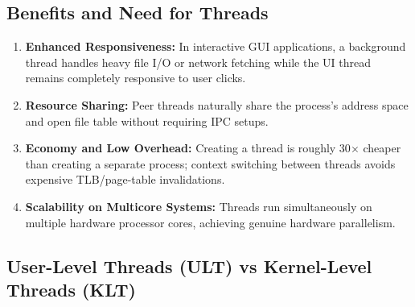 \documentclass[11pt,a4paper]{article}
\begin{document}
\begin{center}
\end{center}

\subsection{Benefits and Need for Threads}

\begin{enumerate}
    \item \textbf{Enhanced Responsiveness:} In interactive GUI applications, a background thread handles heavy file I/O or network fetching while the UI thread remains completely responsive to user clicks.
    \item \textbf{Resource Sharing:} Peer threads naturally share the process's address space and open file table without requiring IPC setups.
    \item \textbf{Economy and Low Overhead:} Creating a thread is roughly 30$\times$ cheaper than creating a separate process; context switching between threads avoids expensive TLB/page-table invalidations.
    \item \textbf{Scalability on Multicore Systems:} Threads run simultaneously on multiple hardware processor cores, achieving genuine hardware parallelism.
\end{enumerate}

\subsection{User-Level Threads (ULT) vs Kernel-Level Threads (KLT)}
\end{document}
